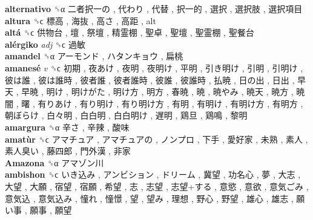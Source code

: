 \textbf{alternativo} ␝α   二者択一の ,  代わり ,  代替 ,  択一的 ,  選択 ,  選択肢 ,  選択項目   \\
\textbf{altura} ␝ϲ   標高 ,  海抜 ,  高さ ,  高距 , alt  \\
\textbf{altá} ␝ϲ   供物台 ,  壇 ,  祭壇 ,  精霊棚 ,  聖卓 ,  聖壇 ,  聖霊棚 ,  聖餐台   \\
\textbf{alérgiko} \emph{adj}  ␝ϲ   過敏   \\
\textbf{amandel} ␝α   アーモンド ,  ハタンキョウ ,  扁桃   \\
\textbf{amanesé} \emph{v}  ␝ϲ   初期 ,  夜あけ ,  夜明 ,  夜明け ,  平明 ,  引き明け ,  引明 ,  引明け ,  彼は誰 ,  彼は誰時 ,  彼者誰 ,  彼者誰時 ,  彼誰 ,  彼誰時 ,  払暁 ,  日の出 ,  日出 ,  早天 ,  早暁 ,  明け ,  明けがた ,  明け方 ,  明方 ,  春暁 ,  暁 ,  暁やみ ,  暁天 ,  暁方 ,  暁闇 ,  曙 ,  有りあけ ,  有り明け ,  有り明け方 ,  有明 ,  有明け ,  有明け方 ,  有明方 ,  朝ぼらけ ,  白々明 ,  白白明 ,  白白明け ,  遅明 ,  鶏旦 ,  鶏鳴 ,  黎明   \\
\textbf{amargura} ␝α   辛さ ,  辛辣 ,  酸味   \\
\textbf{amatùr} ␝ϲ   アマチュア ,  アマチュアの ,  ノンプロ ,  下手 ,  愛好家 ,  未熟 ,  素人 ,  素人臭い ,  藤四郎 ,  門外漢 ,  非家   \\
\textbf{Amazona} ␝α   アマゾン川   \\
\textbf{ambishon} ␝ϲ   いき込み ,  アンビション ,  ドリーム ,  冀望 ,  功名心 ,  夢 ,  大志 ,  大望 ,  大願 ,  宿望 ,  宿願 ,  希望 ,  志 ,  志望 ,  志望+する ,  意慾 ,  意欲 ,  意気ごみ ,  意気込 ,  意気込み ,  憧れ ,  憧憬 ,  望 ,  望み ,  理想 ,  野心 ,  野望 ,  雄心 ,  雄志 ,  願い事 ,  願事 ,  願望   \\
